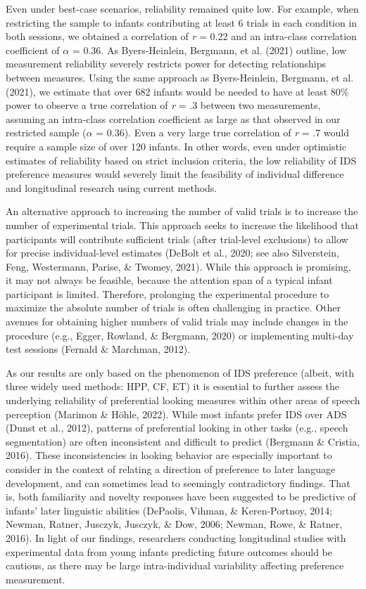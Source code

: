 \documentclass[
  man,floatsintext]{apa6}
\begin{document}
Even under best-case scenarios, reliability remained quite low. For example, when restricting the sample to infants contributing at least 6 trials in each condition in both sessions, we obtained a correlation of \emph{r} = 0.22 and an intra-class correlation coefficient of \(\alpha\) = 0.36. As Byers-Heinlein, Bergmann, et al. (2021) outline, low measurement reliability severely restricts power for detecting relationships between measures. Using the same approach as Byers-Heinlein, Bergmann, et al. (2021), we estimate that over 682 infants would be needed to have at least 80\% power to observe a true correlation of \emph{r} = .3 between two measurements, assuming an intra-class correlation coefficient as large as that observed in our restricted sample (\(\alpha\) = 0.36). Even a very large true correlation of \emph{r} = .7 would require a sample size of over 120 infants. In other words, even under optimistic estimates of reliability based on strict inclusion criteria, the low reliability of IDS preference measures would severely limit the feasibility of individual difference and longitudinal research using current methods.

An alternative approach to increasing the number of valid trials is to increase the number of experimental trials.
This approach seeks to increase the likelihood that participants will contribute sufficient trials (after trial-level exclusions) to allow for precise individual-level estimates (DeBolt et al., 2020; see also Silverstein, Feng, Westermann, Parise, \& Twomey, 2021).
While this approach is promising, it may not always be feasible, because the attention span of a typical infant participant is limited.
Therefore, prolonging the experimental procedure to maximize the absolute number of trials is often challenging in practice.
Other avenues for obtaining higher numbers of valid trials may include changes in the procedure (e.g., Egger, Rowland, \& Bergmann, 2020) or implementing multi-day test sessions (Fernald \& Marchman, 2012).

As our results are only based on the phenomenon of IDS preference (albeit, with three widely used methods: HPP, CF, ET) it is essential to further assess the underlying reliability of preferential looking measures within other areas of speech perception (Marimon \& Höhle, 2022).
While most infants prefer IDS over ADS (Dunst et al., 2012), patterns of preferential looking in other tasks (e.g., speech segmentation) are often inconsistent and difficult to predict (Bergmann \& Cristia, 2016).
These inconsistencies in looking behavior are especially important to consider in the context of relating a direction of preference to later language development, and can sometimes lead to seemingly contradictory findings.
That is, both familiarity and novelty responses have been suggested to be predictive of infants' later linguistic abilities (DePaolis, Vihman, \& Keren-Portnoy, 2014; Newman, Ratner, Jusczyk, Jusczyk, \& Dow, 2006; Newman, Rowe, \& Ratner, 2016).
In light of our findings, researchers conducting longitudinal studies with experimental data from young infants predicting future outcomes should be cautious, as there may be large intra-individual variability affecting preference measurement.
\end{document}
